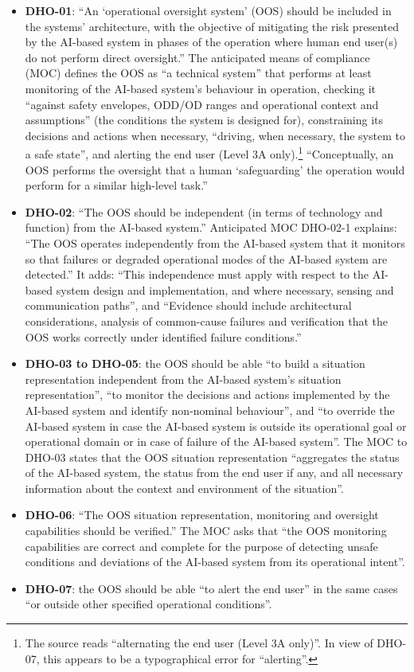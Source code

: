 \documentclass[11pt]{article}
\begin{document}
\begin{itemize}
\item \textbf{DHO-01}: ``An `operational oversight system' (OOS) should be included in the systems' architecture, with the objective of mitigating the risk presented by the AI-based system in phases of the operation where human end user(s) do not perform direct oversight.'' The anticipated means of compliance (MOC) defines the OOS as ``a technical system'' that performs at least monitoring of the AI-based system's behaviour in operation, checking it ``against safety envelopes, ODD/OD ranges and operational context and assumptions'' (the conditions the system is designed for), constraining its decisions and actions when necessary, ``driving, when necessary, the system to a safe state'', and alerting the end user (Level 3A only).\footnote{The source reads ``alternating the end user (Level 3A only)''. In view of DHO-07, this appears to be a typographical error for ``alerting''.} ``Conceptually, an OOS performs the oversight that a human `safeguarding' the operation would perform for a similar high-level task.''
\item \textbf{DHO-02}: ``The OOS should be independent (in terms of technology and function) from the AI-based system.'' Anticipated MOC DHO-02-1 explains: ``The OOS operates independently from the AI-based system that it monitors so that failures or degraded operational modes of the AI-based system are detected.'' It adds: ``This independence must apply with respect to the AI-based system design and implementation, and where necessary, sensing and communication paths'', and ``Evidence should include architectural considerations, analysis of common-cause failures and verification that the OOS works correctly under identified failure conditions.''
\item \textbf{DHO-03 to DHO-05}: the OOS should be able ``to build a situation representation independent from the AI-based system's situation representation'', ``to monitor the decisions and actions implemented by the AI-based system and identify non-nominal behaviour'', and ``to override the AI-based system in case the AI-based system is outside its operational goal or operational domain or in case of failure of the AI-based system''. The MOC to DHO-03 states that the OOS situation representation ``aggregates the status of the AI-based system, the status from the end user if any, and all necessary information about the context and environment of the situation''.
\item \textbf{DHO-06}: ``The OOS situation representation, monitoring and oversight capabilities should be verified.'' The MOC asks that ``the OOS monitoring capabilities are correct and complete for the purpose of detecting unsafe conditions and deviations of the AI-based system from its operational intent''.
\item \textbf{DHO-07}: the OOS should be able ``to alert the end user'' in the same cases ``or outside other specified operational conditions''.
\end{itemize}
\end{document}

